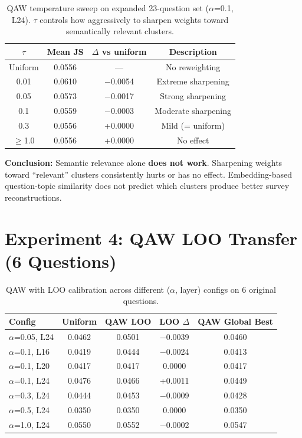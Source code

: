 \documentclass[10pt,a4paper]{article}
\begin{document}
\begin{table}[h]
\centering\small
\caption{QAW temperature sweep on expanded 23-question set ($\alpha$=0.1, L24). $\tau$ controls how aggressively to sharpen weights toward semantically relevant clusters.}
\begin{tabular}{@{}cccc@{}}
\toprule
$\tau$ & Mean JS & $\Delta$ vs uniform & Description \\
\midrule
Uniform & 0.0556 & --- & No reweighting \\
0.01 & 0.0610 & $-$0.0054 & Extreme sharpening \\
0.05 & 0.0573 & $-$0.0017 & Strong sharpening \\
0.1 & 0.0559 & $-$0.0003 & Moderate sharpening \\
0.3 & 0.0556 & +0.0000 & Mild (= uniform) \\
$\geq$1.0 & 0.0556 & +0.0000 & No effect \\
\bottomrule
\end{tabular}
\end{table}

\textbf{Conclusion:} Semantic relevance alone \textbf{does not work}. Sharpening weights toward ``relevant'' clusters consistently hurts or has no effect. Embedding-based question-topic similarity does not predict which clusters produce better survey reconstructions.

\section{Experiment 4: QAW LOO Transfer (6 Questions)}

\begin{table}[h]
\centering\small
\caption{QAW with LOO calibration across different ($\alpha$, layer) configs on 6 original questions.}
\begin{tabular}{@{}lcccc@{}}
\toprule
Config & Uniform & QAW LOO & LOO $\Delta$ & QAW Global Best \\
\midrule
$\alpha$=0.05, L24 & 0.0462 & 0.0501 & $-$0.0039 & 0.0460 \\
$\alpha$=0.1, L16 & 0.0419 & 0.0444 & $-$0.0024 & 0.0413 \\
$\alpha$=0.1, L20 & 0.0417 & 0.0417 & 0.0000 & 0.0417 \\
$\alpha$=0.1, L24 & 0.0476 & 0.0466 & +0.0011 & 0.0449 \\
$\alpha$=0.3, L24 & 0.0444 & 0.0453 & $-$0.0009 & 0.0428 \\
$\alpha$=0.5, L24 & 0.0350 & 0.0350 & 0.0000 & 0.0350 \\
$\alpha$=1.0, L24 & 0.0550 & 0.0552 & $-$0.0002 & 0.0547 \\
\bottomrule
\end{tabular}
\end{table}
\end{document}
